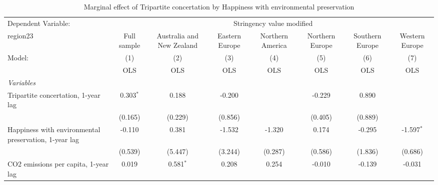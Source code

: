 
\begin{table}[htbp]
   \caption{Marginal effect of Tripartite concertation by Happiness with environmental preservation}
   \centering
   \begin{tabular}{lccccccc}
      \toprule
      Dependent Variable: & \multicolumn{7}{c}{Stringency value modified}\\
      region23                                                                                    & Full sample   & Australia and New Zealand & Eastern Europe & Northern America & Northern Europe & Southern Europe & Western Europe \\   
      Model:                                                                                      & (1)           & (2)                       & (3)            & (4)              & (5)             & (6)             & (7)\\  
                                                                                                  &  OLS          & OLS                       & OLS            & OLS              & OLS             & OLS             & OLS\\  
      \midrule
      \emph{Variables}\\
      Tripartite concertation, 1-year lag                                                         & 0.303$^{*}$   & 0.188                     & -0.200         &                  & -0.229          & 0.890           &   \\   
                                                                                                  & (0.165)       & (0.229)                   & (0.856)        &                  & (0.405)         & (0.889)         &   \\   
      Happiness with environmental preservation, 1-year lag                                       & -0.110        & 0.381                     & -1.532         & -1.320           & 0.174           & -0.295          & -1.597$^{*}$\\   
                                                                                                  & (0.539)       & (5.447)                   & (3.244)        & (0.287)          & (0.586)         & (1.836)         & (0.686)\\   
      CO2 emissions per capita, 1-year lag                                                        & 0.019         & 0.581$^{*}$               & 0.208          & 0.254            & -0.010          & -0.139          & -0.031\\   

\end{tabular}
\end{table}
